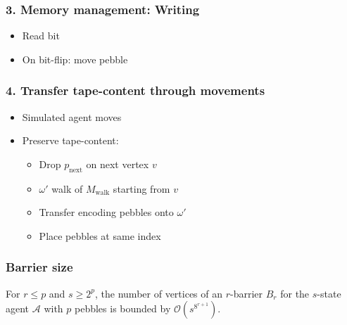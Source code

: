 \documentclass{beamer}
\begin{document}
\begin{frame}
  \frametitle{3. Memory management: Writing}
  \begin{itemize}
    \item Read bit
    \item On bit-flip: move pebble
  \end{itemize}
  \resizebox{\textwidth}{!}{}
\end{frame}

\begin{frame}
  \frametitle{4. Transfer tape-content through movements}
  \begin{itemize}
    \item Simulated agent moves
    \item Preserve tape-content:
      \begin{itemize}
        \item Drop $p_{\text{next}}$ on next vertex $v$
        \item $\omega'$ walk of $M_{\text{walk}}$ starting from $v$
        \item Transfer encoding pebbles onto $\omega'$
        \item Place pebbles at same index
      \end{itemize}
  \end{itemize}
\end{frame}

\begin{frame}
  \frametitle{Barrier size}
  \begin{mdframed}
    \begin{theorem}
      For $r\leq p$ and $s\geq 2^{p}$, the number of vertices of an $r$-barrier
      $B_{r}$ for the $s$-state agent $\mathcal{A}$ with $p$ pebbles is bounded
      by $\mathcal{O}(s^{8^{r+1}})$.
    \end{theorem}
  \end{mdframed}
  \begin{center}
    \resizebox{\textwidth}{!}{}
  \end{center}
\end{frame}
\end{document}

